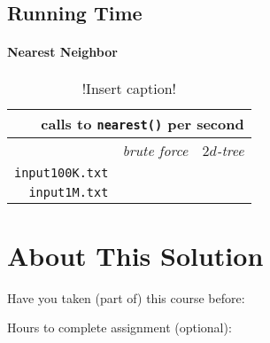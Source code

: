 \documentclass[11pt,a4paper,notitlepage]{article}
\newcommand{\explanation}[1]{}  %
\begin{document}
\subsection*{Running Time}
\explanation{
   Give the expected running time in seconds (using tilde notation)
   to build a 2d-tree on N random points in the unit square.
   Use empirical evidence by creating a table of different values of N
   and the timing results. (Do not count the time to generate the N 
   points or to read them in from standard input.)
}


\paragraph*{Nearest Neighbor}
\explanation{
   How many nearest neighbor calculations can your brute-force
   implementation perform per second for input100K.txt (100,000 points)
   and input1M.txt (1 million points), where the query points are
   random points in the unit square? Explain how you determined the
   operations per second. (Do not count the time to read in the points
   or to build the 2d-tree.) 
(The files are in \url{ftp://ftp.cs.princeton.edu/pub/cs226/kdtree})
%
% 
   Repeat the question but with the 2d-tree implementation.}


\begin{table}[htbp]
\renewcommand{\arraystretch}{2}
  \centering
  \caption{!Insert caption!}
        \label{tab:table1}
        \begin{tabular}{|r| c | c |}
          \multicolumn{3}{r}{calls to \texttt{nearest()} per second} \\
        \hline
         & \qquad \emph{brute force} \qquad & \qquad \emph{$2d$-tree} \qquad \\
        \hline
        \texttt{input100K.txt} & & \\\hline
        \texttt{input1M.txt} & & \\
        \hline
        \end{tabular}
\end{table}



\section{About This Solution}

Have you taken (part of) this course before:
\smallskip

Hours to complete assignment (optional):
\end{document}

